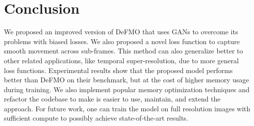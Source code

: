 \section{Conclusion}

We proposed an improved version of DeFMO that uses GANs to overcome its problems with biased losses.
We also proposed a novel loss function to capture smooth movement across sub-frames.
This method can also generalize better to other related applications, like temporal super-resolution, due to more general loss functions.
Experimental results show that the proposed model performs better than DeFMO on their benchmark, but at the cost of higher memory usage during training.
We also implement popular memory optimization techniques and refactor the codebase to make is easier to use, maintain, and extend the approach.
For future work, one can train the model on full resolution images with sufficient compute to possibly achieve state-of-the-art results.
